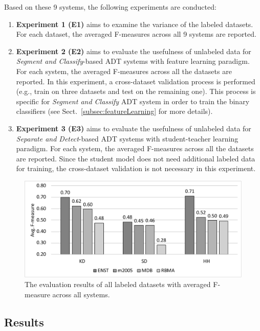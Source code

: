 \documentclass{article}
\begin{document}
Based on these 9 systems, the following experiments are conducted:
\begin{enumerate}[]
\item \textbf{Experiment 1 (E1)} aims to examine the variance of the labeled datasets. For each dataset, the averaged F-measures across all 9 systems are reported. 
\item \textbf{Experiment 2 (E2)} aims to evaluate the usefulness of unlabeled data for \textit{Segment and Classify}-based ADT systems with feature learning paradigm. For each system, the averaged F-measures across all the datasets are reported. In this experiment, a cross-dataset validation process is performed (e.g., train on three datasets and test on the remaining one). This process is specific for \textit{Segment and Classify} ADT system in order to train the binary classifiers (see Sect.~\ref{subsec:featureLearning} for more details).
\item \textbf{Experiment 3 (E3)} aims to evaluate the usefulness of unlabeled data for \textit{Separate and Detect}-based ADT systems with student-teacher learning paradigm. For each system, the averaged F-measures across all the datasets are reported. Since the student model does not need additional labeled data for training, the cross-dataset validation is not necessary in this experiment. 
\end{enumerate}

\begin{figure}
\centering
\includegraphics[width = \columnwidth]{./figs/avgAcrossDatasets.pdf}
\caption{The evaluation results of all labeled datasets with averaged F-measure across all systems.}
\label{fig:resultsAcrossDatasets}
\end{figure}

\subsection{Results}
\end{document}
